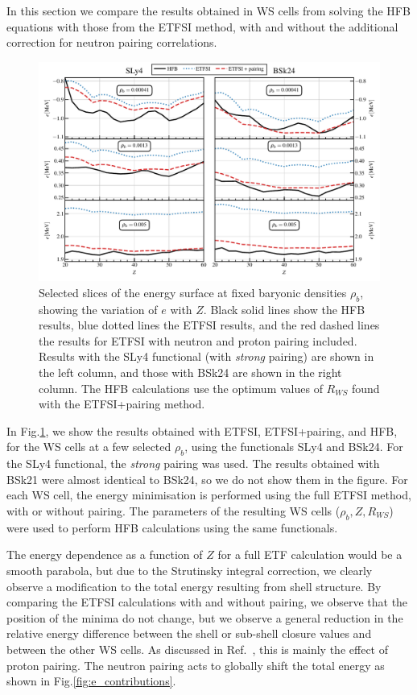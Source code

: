 \documentclass[
    amsmath,amssymb,
    aps,
    prc,
    floatfix,
]{revtex4-2}
\begin{document}
In this section we compare the results obtained in WS cells from solving the HFB equations with those from the ETFSI method, with and without the additional correction for neutron pairing correlations.

   \begin{figure}
        \centering
        \includegraphics{figs/slices_SLy4_BSk24.pdf}
        \caption{Selected slices of the energy surface at fixed baryonic densities $\rho_b$, showing the variation of $e$ with $Z$. Black solid lines show the HFB results, blue dotted lines the ETFSI results, and the red dashed lines the results for ETFSI with neutron and proton pairing included. Results with the SLy4 functional (with \emph{strong} pairing) are shown in the left column, and those with BSk24 are shown in the right column. The HFB calculations use the optimum values of $R_{WS}$ found with the ETFSI+pairing method.}
        \label{fig:etf_hfb_slices}
    \end{figure}

In Fig.\ref{fig:etf_hfb_slices}, we show the results obtained with ETFSI, ETFSI+pairing, and HFB, for the WS cells at a few selected $\rho_b$, using the functionals SLy4 and BSk24. For the SLy4 functional, the \emph{strong} pairing was used. The results obtained with  BSk21 were almost identical to BSk24, so we do not show them in the figure.
For each WS cell, the energy minimisation is performed using the full ETFSI method, with or without pairing. The parameters of the resulting WS cells ($\rho_b, Z, R_{WS}$) were used to perform HFB calculations using the same functionals. 

The energy dependence as a function of $Z$ for a full ETF calculation would be a smooth parabola, but due to the Strutinsky integral correction, we clearly observe a modification to the total energy resulting from shell structure.
By comparing the ETFSI calculations with and without pairing, we observe that the position of the minima do not change, but we observe a general reduction in the relative energy difference between the shell or sub-shell closure values and between the other WS cells. As discussed in Ref.~\cite{pearson2015role}, this is mainly the effect of proton pairing. The neutron pairing acts to globally shift the total energy as shown in Fig.\ref{fig:e_contributions}.
\end{document}
